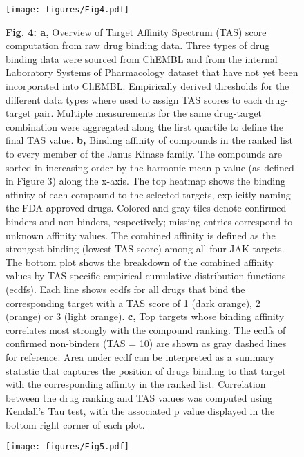\documentclass{article}
\begin{document}

\begin{figure}
  \centering
  \texttt{[image: figures/Fig4.pdf]}
\end{figure}

\begin{figure}
  \caption{\textbf{Fig. 4: a,} Overview of Target Affinity Spectrum (TAS) score computation from raw drug binding data. Three types of drug binding data were sourced from ChEMBL and from the internal Laboratory Systems of Pharmacology dataset that have not yet been incorporated into ChEMBL. Empirically derived thresholds for the different data types where used to assign TAS scores to each drug-target pair. Multiple measurements for the same drug-target combination were aggregated along the first quartile to define the final TAS value. \textbf{b,} Binding affinity of compounds in the ranked list to every member of the Janus Kinase family. The compounds are sorted in increasing order by the harmonic mean p-value (as defined in Figure 3) along the x-axis. The top heatmap shows the binding affinity of each compound to the selected targets, explicitly naming the FDA-approved drugs. Colored and gray tiles denote confirmed binders and non-binders, respectively; missing entries correspond to unknown affinity values. The combined affinity is defined as the strongest binding (lowest TAS score) among all four JAK targets. The bottom plot shows the breakdown of the combined affinity values by TAS-specific empirical cumulative distribution functions (ecdfs). Each line shows ecdfs for all drugs that bind the corresponding target with a TAS score of 1 (dark orange), 2 (orange) or 3 (light orange). \textbf{c,} Top targets whose binding affinity correlates most strongly with the compound ranking. The ecdfs of confirmed non-binders (TAS = 10) are shown as gray dashed lines for reference. Area under ecdf can be interpreted as a summary statistic that captures the position of drugs binding to that target with the corresponding affinity in the ranked list. Correlation between the drug ranking and TAS values was computed using Kendall’s Tau test, with the associated p value displayed in the bottom right corner of each plot.}
\end{figure}


\begin{landscape}
  \begin{figure}
    \centering
    \texttt{[image: figures/Fig5.pdf]}
  \end{figure}
\end{landscape}
\end{document}

